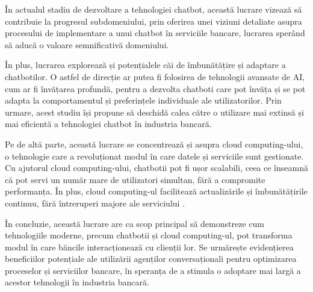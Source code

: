 În actualul stadiu de dezvoltare a tehnologiei chatbot, această lucrare vizează să contribuie la progresul subdomeniului, prin oferirea unei viziuni detaliate asupra procesului de implementare a unui chatbot în serviciile bancare, lucrarea sperând să aducă o valoare semnificativă domeniului.

În plus, lucrarea explorează și potențialele căi de îmbunătățire și adaptare a chatbotilor. O astfel de direcție ar putea fi folosirea de tehnologii avansate de AI, cum ar fi învățarea profundă, pentru a dezvolta chatboti care pot învăța și se pot adapta la comportamentul și preferințele individuale ale utilizatorilor. Prin urmare, acest studiu își propune să deschidă calea către o utilizare mai extinsă și mai eficientă a tehnologiei chatbot în industria bancară.

Pe de altă parte, această lucrare se concentrează și asupra cloud computing-ului, o tehnologie care a revoluționat modul în care datele și serviciile sunt gestionate. Cu ajutorul cloud computing-ului, chatbotii pot fi ușor scalabili, ceea ce înseamnă că pot servi un număr mare de utilizatori simultan, fără a compromite performanța. În plus, cloud computing-ul facilitează actualizările și îmbunătățirile continuu, fără întreruperi majore ale serviciului \cite{mell_grance2011}.

În concluzie, această lucrare are ca scop principal să demonstreze cum tehnologiile moderne, precum chatbotii și cloud computing-ul, pot transforma modul în care băncile interacționează cu clienții lor. Se urmărește evidențierea beneficiilor potențiale ale utilizării agenților conversaționali pentru optimizarea proceselor și serviciilor bancare, în speranța de a stimula o adoptare mai largă a acestor tehnologii în industria bancară.